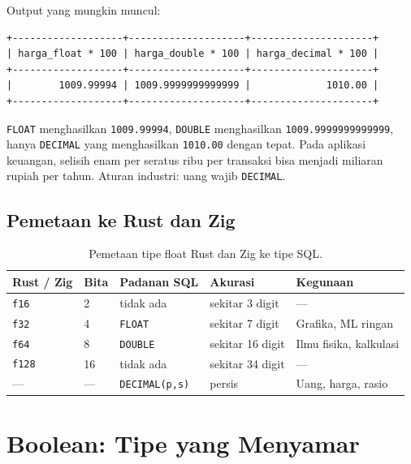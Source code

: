 \documentclass[11pt,a4paper]{article}
\begin{document}
Output yang mungkin muncul:

\begin{lstlisting}[style=out]
+-------------------+--------------------+---------------------+
| harga_float * 100 | harga_double * 100 | harga_decimal * 100 |
+-------------------+--------------------+---------------------+
|        1009.99994 | 1009.9999999999999 |             1010.00 |
+-------------------+--------------------+---------------------+
\end{lstlisting}

\texttt{FLOAT} menghasilkan \texttt{1009.99994}, \texttt{DOUBLE} menghasilkan \texttt{1009.9999999999999}, hanya \texttt{DECIMAL} yang menghasilkan \texttt{1010.00} dengan tepat. Pada aplikasi keuangan, selisih enam per seratus ribu per transaksi bisa menjadi miliaran rupiah per tahun. Aturan industri: uang wajib \texttt{DECIMAL}.

\subsection{Pemetaan ke Rust dan Zig}

\begin{table}[H]
	\centering
	\caption{Pemetaan tipe float Rust dan Zig ke tipe SQL.}
	\label{tab:float}
	\small
	\begin{tabular}{l l l l l}
		\toprule
		Rust / Zig    & Bita & Padanan SQL           & Akurasi          & Kegunaan               \\
		\midrule
		\texttt{f16}  & 2    & tidak ada             & sekitar 3 digit  & ---                    \\
		\texttt{f32}  & 4    & \texttt{FLOAT}        & sekitar 7 digit  & Grafika, ML ringan     \\
		\texttt{f64}  & 8    & \texttt{DOUBLE}       & sekitar 16 digit & Ilmu fisika, kalkulasi \\
		\texttt{f128} & 16   & tidak ada             & sekitar 34 digit & ---                    \\
		---           & ---  & \texttt{DECIMAL(p,s)} & persis           & Uang, harga, rasio     \\
		\bottomrule
	\end{tabular}
\end{table}

\section{Boolean: Tipe yang Menyamar}
\end{document}
